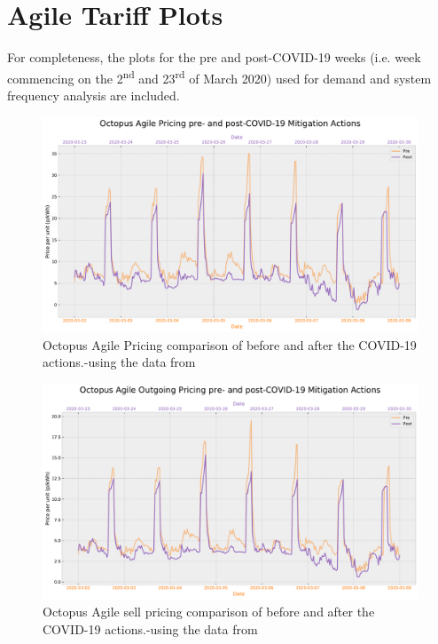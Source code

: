 \documentclass[energies,article,submit,moreauthors,pdftex]{Definitions/mdpi}
\begin{document}
\section{Agile Tariff Plots}
For completeness, the plots for the pre and post-COVID-19 weeks (i.e. week commencing on the 2\textsuperscript{nd} and 23\textsuperscript{rd} of March 2020) used for demand and system frequency analysis are included.
\begin{figure}[H]
\centering
\hspace{-25pt}\includegraphics[width=15 cm]{Graphics/Pre-post_Agilecomp.pdf}
\caption{Octopus Agile Pricing comparison of before and after the COVID-19 actions.-using the data from \cite{HomeUK}}\label{fig:agile_comp_prepost}
\end{figure}

\begin{figure}[H]\centering
\hspace{-25pt}\includegraphics[width=15 cm]{Graphics/Pre-post_AgileOUTGO_comp.pdf}
\caption{Octopus Agile sell pricing comparison of before and after the COVID-19 actions.-using the data from \cite{HomeUK}}\label{fig:agile_OUT_comp_prepost}
\end{figure}  
\end{document}
